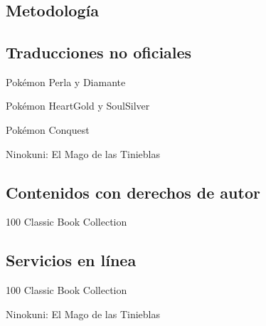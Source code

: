 
\appendix
\section{\appendixname}
\frame{\tableofcontents}

\subsection{Metodología}
\begin{frame}

\end{frame}

\subsection{Traducciones no oficiales}
\begin{frame}{Pokémon Perla y Diamante}
\end{frame}

\begin{frame}{Pokémon HeartGold y SoulSilver}

\end{frame}

\begin{frame}{Pokémon Conquest}

\end{frame}

\begin{frame}{Ninokuni: El Mago de las Tinieblas}

\end{frame}

\subsection{Contenidos con derechos de autor}
\begin{frame}{100 Classic Book Collection}

\end{frame}


\subsection{Servicios en línea}
\begin{frame}{100 Classic Book Collection}

\end{frame}

\begin{frame}{Ninokuni: El Mago de las Tinieblas}

\end{frame}

